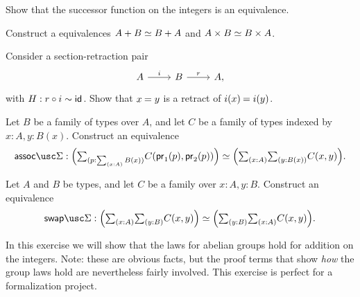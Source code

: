 \begin{exercises}
\begin{subexenum}
  \end{subexenum}
\item \label{ex:succ_equiv}Show that the successor function on the integers is an equivalence.
\item \label{ex:comm_prod}Construct a equivalences $\eqv{A+B}{B+A}$ and $\eqv{A\times B}{B\times A}$.
\item \label{ex:retr_id} Consider a section-retraction pair
  \begin{equation*}
    \begin{tikzcd}
      A \arrow[r,"i"] & B \arrow[r,"r"] & A,
    \end{tikzcd}
  \end{equation*}
  with $H:r\circ i\sim \mathsf{id}_{}$. Show that $\id{x}{y}$ is a retract of $\id{i(x)}{i(y)}$.
\item \label{ex:sigma_assoc}Let $B$ be a family of types over $A$, and let $C$ be a family of types indexed by $x:A,y:B(x)$. Construct an equivalence
  \begin{equation*}
    \assocSigma:\eqv{\Big(\sm{p:\sm{x:A}B(x)}C(\proj 1(p),\proj 2(p))\Big)}{\Big(\sm{x:A}\sm{y:B(x)}C(x,y)\Big)}.
  \end{equation*}
\item \label{ex:sigma_swap}Let $A$ and $B$ be types, and let $C$ be a family over $x:A,y:B$. Construct an equivalence
  \begin{equation*}
    \swapSigma:\eqv{\Big(\sm{x:A}\sm{y:B}C(x,y)\Big)}{\Big(\sm{y:B}\sm{x:A}C(x,y)\Big)}.
  \end{equation*}
\item \label{ex:int_group_laws} In this exercise we will show that the laws for abelian groups hold for addition on the integers. Note: these are obvious facts, but the proof terms that show \emph{how} the group laws hold are nevertheless fairly involved. This exercise is perfect for a formalization project. 

\end{exercises}
